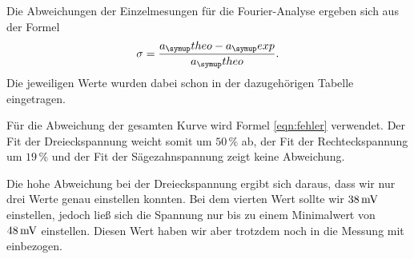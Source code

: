 Die Abweichungen der Einzelmesungen für die Fourier-Analyse ergeben sich aus der Formel
\begin{equation}
  \sigma = \frac{a_\su{theo}-a_\su{exp}}{a_\su{theo}}.
\end{equation}
Die jeweiligen Werte wurden dabei schon in der dazugehörigen Tabelle eingetragen.

Für die Abweichung der gesamten Kurve wird Formel \eqref{eqn:fehler} verwendet.
Der Fit der Dreieckspannung weicht somit um $50\,\%$ ab, der Fit der Rechteckspannung
um $19\,\%$ und der Fit der Sägezahnspannung zeigt keine Abweichung.

\noindent Die hohe Abweichung bei der Dreieckspannung ergibt sich daraus, dass wir nur drei Werte genau
einstellen konnten. Bei dem vierten Wert sollte wir $38 \,\si{\milli\volt}$ einstellen, jedoch
ließ sich die Spannung nur bis zu einem Minimalwert von $48 \,\si{\milli\volt}$ einstellen. Diesen
Wert haben wir aber trotzdem noch in die Messung mit einbezogen.
